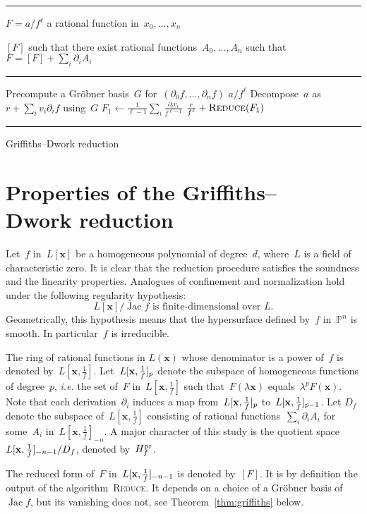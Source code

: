 \documentclass{sig-alternate}
\newenvironment{algoenv}[3][\linewidth]{
\begin{minipage}{#1}\flushleft
\rule{\textwidth}{.08em}\vspace{-\baselineskip}\smallskip
\begin{description}[noitemsep]
\item[\rlap{Input}\phantom{Output}] #2
\item[Output] #3
\end{description}
\vspace{-\baselineskip}
\rule{\textwidth}{.05em}
\begin{algorithmic}
}{\end{algorithmic}
\vspace{-.5\baselineskip}
\rule{\textwidth}{.08em}
\end{minipage}}
\newcommand{\Reduce}{\mathop{\textsc{Reduce}}}
\newcommand{\tReduce}{\textsc{Reduce}}
\newcommand{\Lx}{L[\mathbf x]}
\DeclareMathOperator{\Jac}{Jac}
\newcommand{\PP}{\mathbb{P}}
\newcommand{\xx}{\mathbf{x}}
\newcommand{\pr}{{\smash{\mathrm{pr}}}}
\newcommand{\Hfp}{H_f^{\pr}}
\newcommand{\Lxfp}{\Lxf_{\smash{-n-1}}}
\newcommand{\Lxf}{L[\xx,\smash{\tfrac{1}{f}}]}
\begin{document}
\begin{algo}
\centering
\begin{algoenv}{
    $F = a/f^\ell$ a rational function in~$x_0,\dotsc,x_n$
  }{$[F]$ such that there exist rational functions~$A_0,\dotsc,A_n$ such that $F = [F] +\sum_i\partial_i A_i$}
  \State Precompute a Gr\"obner basis~$G$ for~$(\partial_0f,\dotsc,\partial_nf)$
   \Return $a/f^\ell$
  \EndIf
  \State Decompose~$a$ as~$r + \sum_i v_i \partial_i f$ using~$G$
  \State $F_1 \gets \frac{1}{\ell-1}\sum_i\frac{\partial_iv_i}{f^{\ell-1}}$
  \State \Return $\frac{r}{f^\ell}+\Reduce(F_1)$
  \EndProcedure
\end{algoenv}
\caption{Griffiths--Dwork reduction}
\label{algo:reduce}
\end{algo}


\section{Properties of the Griffiths--\\Dwork reduction}
\label{sec:prop-grif}
\noindent Let~$f$ in~$L[\xx]$ be a homogeneous polynomial of degree~$d$, where~$L$ is a field of characteristic zero.
It is clear that the reduction procedure satisfies the soundness and the linearity properties.
Analogues of confinement and normalization hold under the following regularity hypothesis: 
\[ \tag{H}\label{eqn:regularity} \Lx/\!\Jac f\text{ is finite-dimensional over $L$}. \]
Geometrically, this hypothesis means that the hypersurface defined by~$f$ in~$\PP^n$ is smooth.
In particular~$f$ is irreducible.

The ring of rational functions in $L(\xx)$ whose denominator is a power of~$f$ is denoted by~$L[\xx,\tfrac{1}{f}]$.
Let~$\Lxf_p$ denote the subspace of homogeneous functions of degree~$p$, \emph{i.e.} the set of~$F$ in~$L[\xx,\tfrac{1}{f}]$ such that~$F(\lambda \xx)$ equals~$\lambda^p F(\xx)$.
Note that each derivation~$\partial_i$ induces a map from~$\Lxf_p$ to~$\Lxf_{p-1}$.
Let $D_f$ denote the subspace of~$L[\xx,\tfrac{1}{f}]$ consisting of rational functions~$\sum_i \partial_i A_i$ for some~$A_i$ in~$L[\xx,\tfrac{1}{f}]_{-n}$.
A major character of this study is the quotient space~$\Lxfp/D_f$, denoted by~$\Hfp$.

The reduced form of~$F$ in~$\Lxfp$ is denoted by~$[F]$.
It is by definition the output of the algorithm~\tReduce.
It depends on a choice of a Gröbner basis of~$\Jac f$, but its vanishing does not, see Theorem~\ref{thm:griffiths} below.
\end{document}
